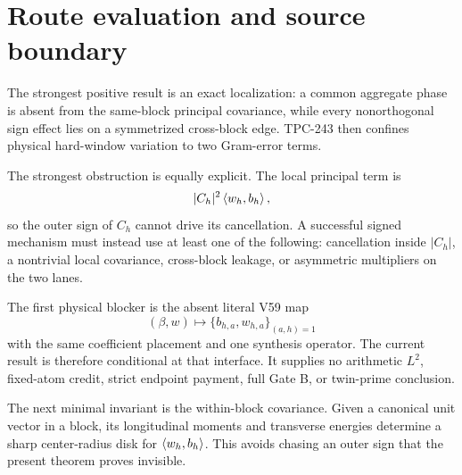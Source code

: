 \section{Route evaluation and source boundary}

The strongest positive result is an exact localization: a common aggregate
phase is absent from the same-block principal covariance, while every
nonorthogonal sign effect lies on a symmetrized cross-block edge.  TPC-243 then
confines physical hard-window variation to two Gram-error terms.

The strongest obstruction is equally explicit.  The local principal term is
\[
|C_h|^2\left\langle w_h,b_h\right\rangle,
\]
so the outer sign of $C_h$ cannot drive its cancellation.  A successful signed
mechanism must instead use at least one of the following: cancellation inside
$|C_h|$, a nontrivial local covariance, cross-block leakage, or asymmetric
multipliers on the two lanes.

The first physical blocker is the absent literal V59 map
\[
(\beta,w)\longmapsto\{b_{h,a},w_{h,a}\}_{(a,h)=1}
\]
with the same coefficient placement and one synthesis operator.  The current
result is therefore conditional at that interface.  It supplies no arithmetic
$L^2$, fixed-atom credit, strict endpoint payment, full Gate B, or twin-prime
conclusion.

The next minimal invariant is the within-block covariance.  Given a canonical
unit vector in a block, its longitudinal moments and transverse energies
determine a sharp center-radius disk for $\left\langle w_h,b_h\right\rangle$.  This avoids chasing
an outer sign that the present theorem proves invisible.
